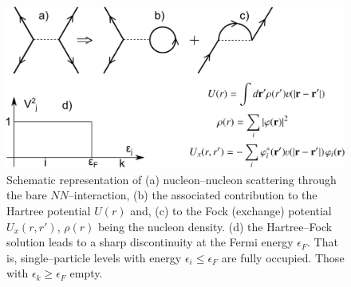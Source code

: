  \begin{figure} \centerline{\includegraphics*[width=\textwidth,angle=0]{nutshell/figs/diagrams1.pdf}}
 \caption{Schematic representation of (a) nucleon--nucleon scattering through the bare $NN$--interaction, (b) the associated contribution to the Hartree potential $U(r)$ and, (c) to the Fock (exchange) potential $U_x(r,r')$, $\rho(r)$ being the nucleon density. (d) the Hartree--Fock solution leads to a sharp discontinuity at the Fermi energy $\epsilon_F$. That is, single--particle levels with energy $\epsilon_i\leq \epsilon_F$ are fully occupied. Those with $\epsilon_k\geq \epsilon_F$ empty.}\label{fig1A2}
 \end{figure}
 
